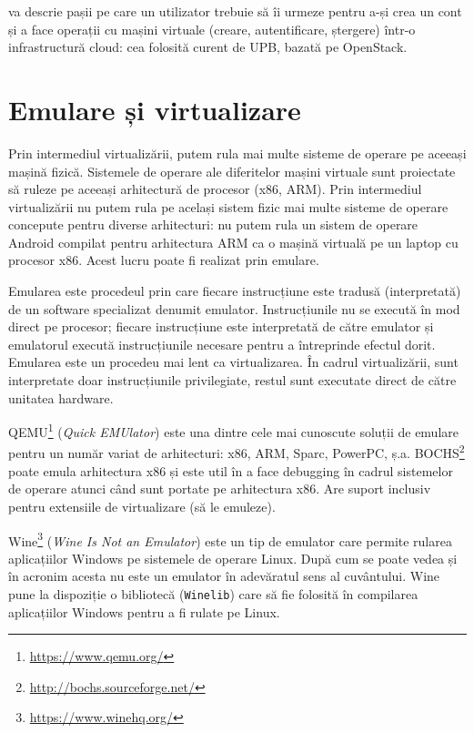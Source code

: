  va descrie pașii pe care un utilizator trebuie să îi
urmeze pentru a-și crea un cont și a face operații cu mașini virtuale (creare,
autentificare, ștergere) într-o infrastructură cloud: cea folosită curent de UPB, bazată pe OpenStack.

\section{Emulare și virtualizare}
\label{sec:vm:emulation}

Prin intermediul virtualizării, putem rula mai multe sisteme de operare pe
aceeași mașină fizică. Sistemele de operare ale diferitelor mașini virtuale sunt proiectate să ruleze pe aceeași
arhitectură de procesor (x86, ARM). Prin intermediul virtualizării nu putem rula pe
același sistem fizic mai multe sisteme de operare concepute pentru diverse
arhitecturi: nu putem rula un sistem de operare Android compilat pentru
arhitectura ARM ca o mașină virtuală pe un laptop cu procesor x86. Acest lucru
poate fi realizat prin emulare.

Emularea este procedeul prin care fiecare
instrucțiune este tradusă (interpretată) de un software specializat denumit
emulator. Instrucțiunile nu se execută în mod direct pe procesor; fiecare
instrucțiune este interpretată de către emulator și emulatorul execută
instrucțiunile necesare pentru a întreprinde efectul dorit. Emularea este un
procedeu mai lent ca virtualizarea. În cadrul virtualizării, sunt
interpretate doar instrucțiunile privilegiate, restul sunt executate direct de
către unitatea hardware.

QEMU\footnote{\url{https://www.qemu.org/}}  (\textit{Quick EMUlator}) este una dintre cele mai cunoscute soluții de emulare pentru un număr variat de arhitecturi: x86, ARM, Sparc, PowerPC, ș.a.
BOCHS\footnote{\url{http://bochs.sourceforge.net/}} poate emula arhitectura x86 și este util în a face debugging în cadrul sistemelor de operare atunci când sunt portate pe arhitectura x86.
Are suport inclusiv pentru extensiile de virtualizare (să le emuleze).

Wine\footnote{\url{https://www.winehq.org/}} (\textit{Wine Is Not an Emulator}) este un tip de emulator care
permite rularea aplicațiilor Windows pe sistemele de operare Linux. După cum se
poate vedea și în acronim acesta nu este un emulator în adevăratul sens al
cuvântului. Wine pune la dispoziție o bibliotecă
(\texttt{Winelib}) care să fie folosită în compilarea aplicațiilor Windows pentru a fi
rulate pe Linux.


